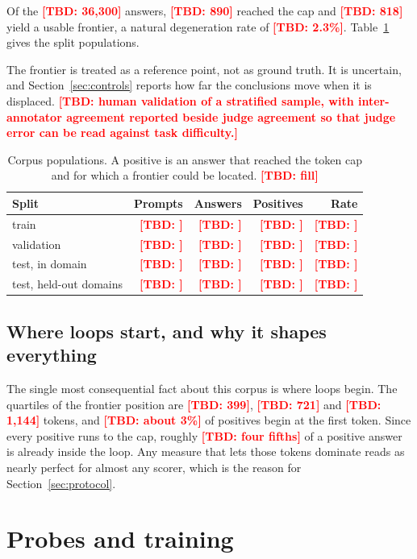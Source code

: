 \documentclass{article}
\newcommand{\TBD}[1]{\textcolor{red}{\textbf{[TBD: #1]}}}
\begin{document}
Of the \TBD{36{,}300} answers, \TBD{890} reached the cap and \TBD{818} yield a
usable frontier, a natural degeneration rate of \TBD{2.3\%}. Table~\ref{tab:corpus}
gives the split populations.

The frontier is treated as a reference point, not as ground truth. It is
uncertain, and Section~\ref{sec:controls} reports how far the conclusions move
when it is displaced. \TBD{human validation of a stratified sample, with
inter-annotator agreement reported beside judge agreement so that judge error can
be read against task difficulty.}

\begin{table}[t]
  \caption{Corpus populations. A positive is an answer that reached the token cap
  and for which a frontier could be located. \TBD{fill}}
  \label{tab:corpus}
  \centering
  \begin{tabular}{lrrrr}
    \toprule
    Split & Prompts & Answers & Positives & Rate \\
    \midrule
    train                & \TBD{} & \TBD{} & \TBD{} & \TBD{} \\
    validation           & \TBD{} & \TBD{} & \TBD{} & \TBD{} \\
    test, in domain      & \TBD{} & \TBD{} & \TBD{} & \TBD{} \\
    test, held-out domains & \TBD{} & \TBD{} & \TBD{} & \TBD{} \\
    \bottomrule
  \end{tabular}
\end{table}

\subsection{Where loops start, and why it shapes everything}
\label{sec:onset-shape}
The single most consequential fact about this corpus is where loops begin. The
quartiles of the frontier position are \TBD{399}, \TBD{721} and \TBD{1{,}144}
tokens, and \TBD{about 3\%} of positives begin at the first token. Since every
positive runs to the cap, roughly \TBD{four fifths} of a positive answer is
already inside the loop. Any measure that lets those tokens dominate reads as
nearly perfect for almost any scorer, which is the reason for
Section~\ref{sec:protocol}.

\section{Probes and training}
\label{sec:probes}
\end{document}
